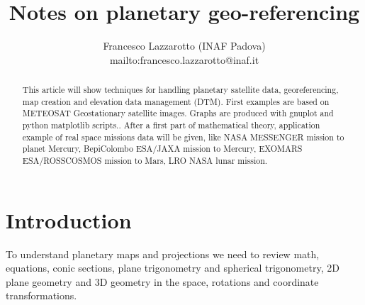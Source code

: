 \documentclass[a4paper,14pt]{article}
\title{Notes on planetary geo-referencing}
\author{Francesco Lazzarotto (INAF Padova)\\ mailto:francesco.lazzarotto@inaf.it}
\begin{document}
\maketitle
\begin{abstract}
This article will show techniques for handling planetary satellite data, georeferencing, map creation and elevation data management (DTM).
First examples are based on METEOSAT Geostationary satellite images. Graphs are produced with gnuplot and python matplotlib scripts..
After a first part of mathematical theory, application example of real space missions data will be given, like NASA MESSENGER mission to planet Mercury, BepiColombo ESA/JAXA mission to Mercury, EXOMARS ESA/ROSSCOSMOS mission to Mars, LRO NASA lunar mission.
\end{abstract}
\tableofcontents
\clearpage
\section{Introduction}
To understand planetary maps and projections we need to review math, equations, conic sections, plane trigonometry and spherical trigonometry, 2D plane geometry and 3D geometry in the space, rotations and coordinate transformations.
\end{document}
